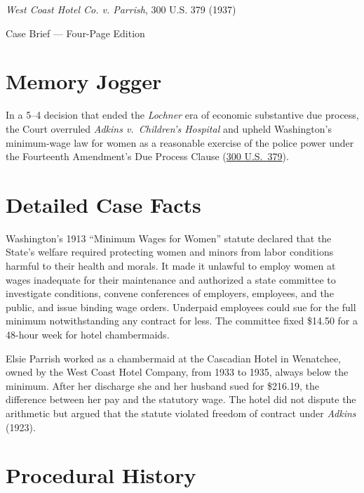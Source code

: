 \documentclass[12pt]{article}
\begin{document}
\begin{center}
{\LARGE \textit{West Coast Hotel Co. v. Parrish}, 300 U.S. 379 (1937)\par}
\vspace{0.8em}
{\large Case Brief --- Four-Page Edition\par}
\end{center}
\vspace{1em}

\section{Memory Jogger}

In a 5--4 decision that ended the \textit{Lochner} era of economic substantive due process, the Court overruled \textit{Adkins v.\ Children's Hospital} and upheld Washington's minimum-wage law for women as a reasonable exercise of the police power under the Fourteenth Amendment's Due Process Clause (\href{https://supreme.justia.com/cases/federal/us/300/379/}{300 U.S.\ 379}).

\section{Detailed Case Facts}

Washington's 1913 ``Minimum Wages for Women'' statute declared that the State's welfare required protecting women and minors from labor conditions harmful to their health and morals. It made it unlawful to employ women at wages inadequate for their maintenance and authorized a state committee to investigate conditions, convene conferences of employers, employees, and the public, and issue binding wage orders. Underpaid employees could sue for the full minimum notwithstanding any contract for less. The committee fixed \$14.50 for a 48-hour week for hotel chambermaids.

Elsie Parrish worked as a chambermaid at the Cascadian Hotel in Wenatchee, owned by the West Coast Hotel Company, from 1933 to 1935, always below the minimum. After her discharge she and her husband sued for \$216.19, the difference between her pay and the statutory wage. The hotel did not dispute the arithmetic but argued that the statute violated freedom of contract under \textit{Adkins} (1923).

\section{Procedural History}
\end{document}

